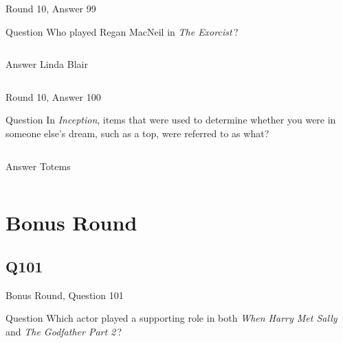 \documentclass[11pt]{beamer}
\begin{document}
\begin{frame}[t]{Round 10, Answer 99}
\vspace{2em}
\begin{block}{Question}
Who played Regan MacNeil in \emph{The Exorcist}\,?
\end{block}
\pause{}
\begin{columns}[T,totalwidth=\linewidth]
\begin{column}{0.35\linewidth}
\begin{block}{Answer}
Linda Blair
\end{block}
\end{column}
\begin{column}{0.6\linewidth}
\begin{center}
\texttt{[image: \{Images/exorcist]}.jpeg}
\end{center}
\end{column}
\end{columns}
\end{frame}
    

\begin{frame}[t]{Round 10, Answer 100}
\vspace{2em}
\begin{block}{Question}
In \emph{Inception}, items that were used to determine whether you were in someone else's dream, such as a top, were referred to as what?
\end{block}
\pause{}
\begin{columns}[T,totalwidth=\linewidth]
\begin{column}{0.35\linewidth}
\begin{block}{Answer}
Totems
\end{block}
\end{column}
\begin{column}{0.6\linewidth}
\begin{center}
\texttt{[image: \{Images/totem]}.jpg}
\end{center}
\end{column}
\end{columns}
\end{frame}
    

\section{Bonus Round}
    

\subsection*{Q101}
\begin{frame}[t]{Bonus Round, Question 101}
\vspace{2em}
\begin{block}{Question}
Which actor played a supporting role in both \emph{When Harry Met Sally} and \emph{The Godfather Part 2}\,?
\end{block}
\end{frame}
    
\end{document}
